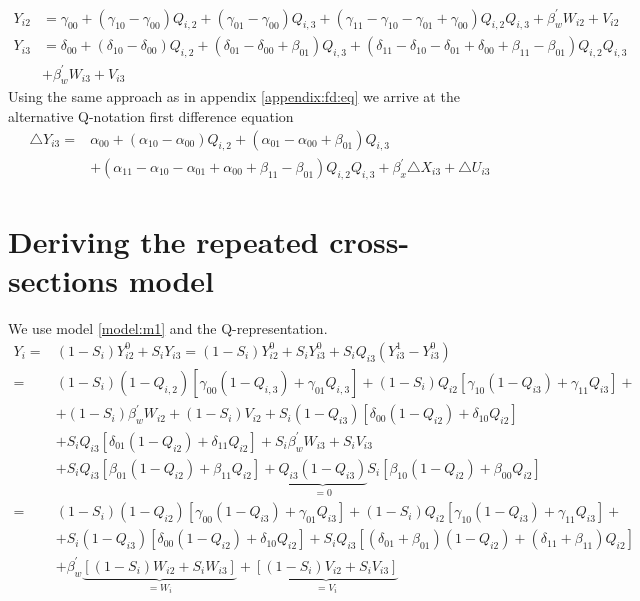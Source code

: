 \documentclass[12pt]{article}
\begin{document}
\begin{align*}\label{model:o1prime}
Y_{i2} &= \gamma_{00} + (\gamma_{10}-\gamma_{00})Q_{i,2} + (\gamma_{01}-\gamma_{00})Q_{i,3} + (\gamma_{11}-\gamma_{10}-\gamma_{01} +\gamma_{00})Q_{i,2}Q_{i,3} + \beta_w^\prime W_{i2} + V_{i2}\\
Y_{i3} &= \delta_{00} + (\delta_{10}-\delta_{00})Q_{i,2}  + (\delta_{01}-\delta_{00}+\beta_{01})Q_{i,3} + (\delta_{11}-\delta_{10}-\delta_{01} +\delta_{00}+\beta_{11}-\beta_{01})Q_{i,2}Q_{i,3} \\
& + \beta_w^\prime W_{i3} + V_{i3} \tag{$O_1^\prime$}
\end{align*}
Using the same approach as in appendix \ref{appendix:fd:eq} we arrive at the alternative Q-notation first difference equation
\begin{equation*}
\begin{split}
\triangle Y_{i3} = &  \alpha_{00} + (\alpha_{10}-\alpha_{00})Q_{i,2} + (\alpha_{01}-\alpha_{00}+\beta_{01})Q_{i,3}  \\
& + (\alpha_{11}-\alpha_{10}-\alpha_{01} +\alpha_{00}+\beta_{11}-\beta_{01})Q_{i,2}Q_{i,3}+\beta_x^\prime \triangle X_{i3} + \triangle U_{i3} 
\end{split}
\end{equation*}

\section{Deriving the repeated cross-sections model} \label{appendix:cross}
We use model \ref{model:m1} and the Q-representation.
\begin{align*}
Y_i = & (1-S_i)Y_{i2}^0 + S_iY_{i3} = (1-S_i)Y_{i2}^0 + S_iY_{i3}^0 + S_iQ_{i3}(Y_{i3}^1-Y_{i3}^0)\\
 = & (1-S_i)(1-Q_{i,2})[\gamma_{00}(1-Q_{i,3})+\gamma_{01}Q_{i,3}] + (1-S_i)Q_{i2}[\gamma_{10}(1-Q_{i3})+\gamma_{11}Q_{i3}] + \\
 & + (1-S_i)\beta_w^\prime W_{i2} + (1-S_i)V_{i2} +S_i(1-Q_{i3})[\delta_{00}(1-Q_{i2})+\delta_{10}Q_{i2}]\\
  &  + S_iQ_{i3}[\delta_{01}(1-Q_{i2})+\delta_{11}Q_{i2}] + S_i\beta_w^\prime W_{i3} + S_iV_{i3}\\
 & + S_iQ_{i3}[\beta_{01}(1-Q_{i2})+\beta_{11}Q_{i2}]+ \underset{=0}{\underbrace{Q_{i3}(1-Q_{i3})}}S_i[\beta_{10}(1-Q_{i2})+\beta_{00}Q_{i2}]\\
 = & (1-S_i)(1-Q_{i2})[\gamma_{00}(1-Q_{i3})+\gamma_{01}Q_{i3}] + (1-S_i)Q_{i2}[\gamma_{10}(1-Q_{i3})+\gamma_{11}Q_{i3}] + \\ & +S_i(1-Q_{i3})[\delta_{00}(1-Q_{i2})+\delta_{10}Q_{i2}] + S_iQ_{i3}[(\delta_{01}+\beta_{01})(1-Q_{i2})+(\delta_{11}+\beta_{11})Q_{i2}]\\
 & + \beta_w^\prime \underset{=W_{i}}{\underbrace{[(1-S_i)W_{i2} + S_iW_{i3}]}} + \underset{=V_{i}}{\underbrace{[(1-S_i)V_{i2} + S_iV_{i3}]}}
\end{align*}
\end{document}
